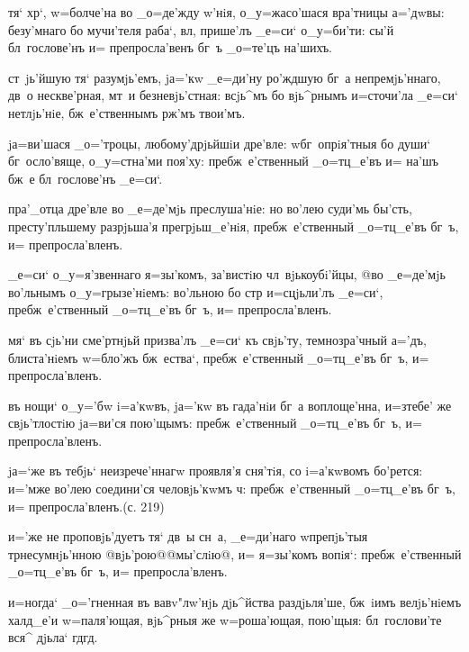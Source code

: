  тя` хр`, w=болче'на во _о=де'жду 
w'нiя, о_у=жасо'шася вра'тницы а='дwвы: безу'мнаго 
бо мучи'теля раба`, вл, прише'лъ _е=си` о_у=би'ти: 
сы'й бл~гослове'нъ и= препросла'венъ бг~ъ _о=те'цъ 
на'шихъ.

  ст~jь'йшую тя` разумjь'емъ, 
jа='кw _е=ди'ну ро'ждшую бг~а непремjь'ннаго, дв~о 
нескве'рная, мт~и безневjь'стная: всjь^мъ бо вjь^рнымъ 
и=сточи'ла _е=си` нетлjь'нiе, бж~е'ственнымъ рж'мъ 
твои'мъ.


  jа=ви'шася _о='троцы, 
любому'дрjьйшiи дре'вле: w\т бг~опрiя'тныя бо души` 
бг~осло'вяще, о_у=стна'ми поя'ху: пребж~е'ственный 
_о=тц_е'въ и= на'шъ бж~е бл~гослове'нъ _е=си`.

 пра'_отца дре'вле во _е=де'мjь 
преслуша'нiе: но во'лею суди'мь бы'сть, престу'пльшему 
разрjьша'я прегрjьш_е'нiя, пребж~е'ственный _о=тц_е'въ 
бг~ъ, и= препросла'вленъ.

 _е=си` о_у=я'звеннаго я=зы'комъ, за'вистiю 
чл~вjькоубi'йцы, @во _е=де'мjь во'льнымъ о_у=грызе'нiемъ: 
во'льною бо стр и=сцjьли'лъ _е=си`, 
пребж~е'ственный _о=тц_е'въ бг~ъ, и= препросла'вленъ.

  мя` въ сjь'ни сме'ртнjьй 
призва'лъ _е=си` къ свjь'ту, темнозра'чный а='дъ, 
блиста'нiемъ w=бло'жъ бж~ества`, пребж~е'ственный 
_о=тц_е'въ бг~ъ, и= препросла'вленъ.


 въ нощи` о_у='бw i=а'кwвъ, jа='кw въ 
гада'нiи бг~а воплоще'нна, и=з\ъ тебе' же свjь'тлостiю 
jа=ви'ся пою'щымъ: пребж~е'ственный _о=тц_е'въ бг~ъ, и= 
препросла'вленъ.

 jа=`же въ тебjь` неизрече'ннагw 
проявля'я сня'тiя, со i=а'кwвомъ бо'рется: и='мже во'лею 
соедини'ся человjь'кwмъ ч: пребж~е'ственный 
_о=тц_е'въ бг~ъ, и= препросла'вленъ.(с. 219)

 и='же не проповjь'дуетъ тя` дв~ы сн~а, 
_е=ди'наго w\т препjь'тыя тр несумнjь'нною 
@вjь'рою@{@мы'слiю@}, и= я=зы'комъ вопiя`: 
пребж~е'ственный _о=тц_е'въ бг~ъ, и= препросла'вленъ.


  и=ногда` _о='гненная въ 
вавv"лw'нjь дjь^йства раздjьля'ше, бж~iимъ велjь'нiемъ 
халд_е'и w=паля'ющая, вjь^рныя же w=роша'ющая, пою'щыя: 
бл~гослови'те вся^ дjьла` гд гд.

